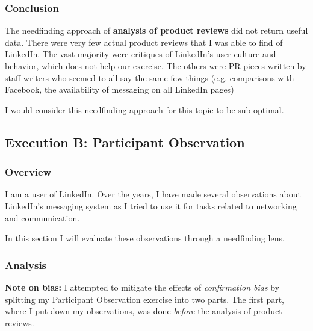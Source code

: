 \documentclass[
	letterpaper, %
]{jdf}
\begin{document}
\subsubsection{Conclusion}
The needfinding approach of \textbf{analysis of product reviews} did not return useful data.
There were very few actual product reviews that I was able to find of LinkedIn. The vast majority were critiques of LinkedIn's user culture and behavior, which does not help our exercise. The others were PR pieces written by staff writers who seemed to all say the same few things (e.g. comparisons with Facebook, the availability of messaging on all LinkedIn pages)

I would consider this needfinding approach for this topic to be sub-optimal.

\subsection{Execution B: Participant Observation}
\subsubsection{Overview}

I am a user of LinkedIn. Over the years, I have made several observations about LinkedIn's messaging system as I tried to use it for tasks related to networking and communication.

In this section I will evaluate these observations through a needfinding lens.





\subsubsection{Analysis}
\textbf{Note on bias:} I attempted to mitigate the effects of \textit{confirmation bias} by splitting my Participant Observation exercise into two parts. The first part, where I put down my observations, was done \textit{before} the analysis of product reviews.
\end{document}
